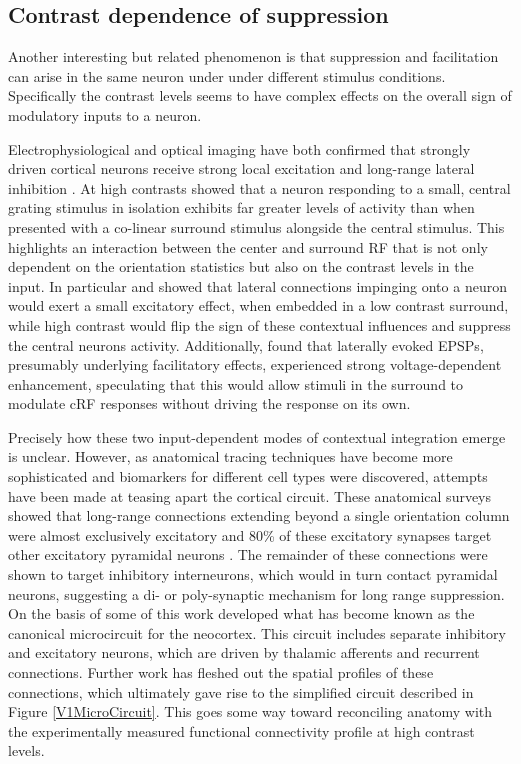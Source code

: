\subsection{Contrast dependence of suppression}

Another interesting but related phenomenon is that suppression and
facilitation can arise in the same neuron under under different
stimulus conditions. Specifically the contrast levels seems to have
complex effects on the overall sign of modulatory inputs to a neuron.

Electrophysiological and optical imaging have both confirmed that
strongly driven cortical neurons receive strong local excitation and
long-range lateral inhibition \citep{Grinvald1994,Sceniak2001}. At
high contrasts \cite{Grinvald1994} showed that a neuron responding to
a small, central grating stimulus in isolation exhibits far greater
levels of activity than when presented with a co-linear surround
stimulus alongside the central stimulus. This highlights an
interaction between the center and surround RF that is not only
dependent on the orientation statistics but also on the contrast
levels in the input. In particular \cite{Hirsch1991} and
\cite{Weliky1995} showed that lateral connections impinging onto a
neuron would exert a small excitatory effect, when embedded in a low
contrast surround, while high contrast would flip the sign of these
contextual influences and suppress the central neurons
activity. Additionally, \cite{Hirsch1991} found that laterally evoked
EPSPs, presumably underlying facilitatory effects, experienced strong
voltage-dependent enhancement, speculating that this would allow
stimuli in the surround to modulate cRF responses without driving the
response on its own.

Precisely how these two input-dependent modes of contextual
integration emerge is unclear. However, as anatomical tracing
techniques have become more sophisticated and biomarkers for different
cell types were discovered, attempts have been made at teasing apart
the cortical circuit. These anatomical surveys showed that long-range
connections extending beyond a single orientation column were almost
exclusively excitatory and 80\% of these excitatory synapses target
other excitatory pyramidal neurons
\citep{Hirsch1991,Kisvarday1997a}. The remainder of these connections
were shown to target inhibitory interneurons, which would in turn
contact pyramidal neurons, suggesting a di- or poly-synaptic mechanism
for long range suppression. On the basis of some of this work
\cite{Douglas1991} developed what has become known as the canonical
microcircuit for the neocortex. This circuit includes separate
inhibitory and excitatory neurons, which are driven by thalamic
afferents and recurrent connections. Further work has fleshed out the
spatial profiles of these connections, which ultimately gave rise to
the simplified circuit described in Figure \ref{V1MicroCircuit}. This
goes some way toward reconciling anatomy with the experimentally
measured functional connectivity profile at high contrast levels.

